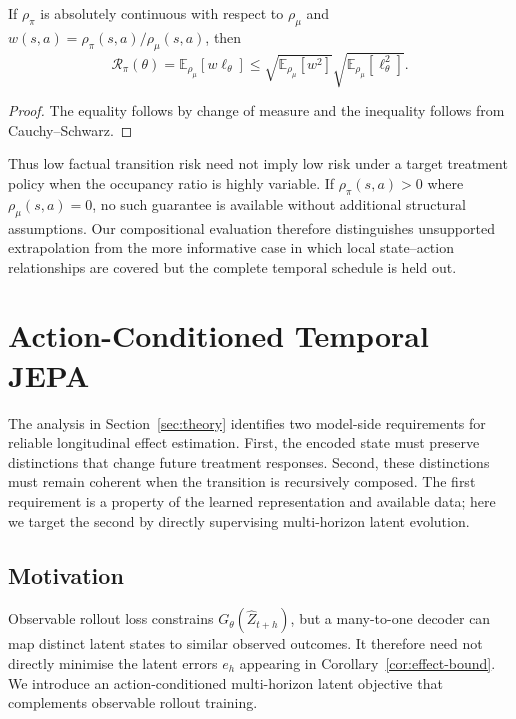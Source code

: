 \begin{proposition}
\label{prop:shift}
If $\rho_\pi$ is absolutely continuous with respect to $\rho_\mu$ and
$w(s,a)=\rho_\pi(s,a)/\rho_\mu(s,a)$, then
\begin{equation}
    \mathcal R_\pi(\theta)
    =\mathbb E_{\rho_\mu}[w\ell_\theta]
    \leq
    \sqrt{\mathbb E_{\rho_\mu}[w^2]}
    \sqrt{\mathbb E_{\rho_\mu}[\ell_\theta^2]}.
    \label{eq:shift-bound}
\end{equation}
\end{proposition}

\begin{proof}
The equality follows by change of measure and the inequality follows
from Cauchy--Schwarz.
\end{proof}

Thus low factual transition risk need not imply low risk under a target
treatment policy when the occupancy ratio is highly variable. If
$\rho_\pi(s,a)>0$ where $\rho_\mu(s,a)=0$, no such guarantee is
available without additional structural assumptions. Our compositional
evaluation therefore distinguishes unsupported extrapolation from the
more informative case in which local state--action relationships are
covered but the complete temporal schedule is held out.

\section{Action-Conditioned Temporal JEPA}
\label{sec:method}

The analysis in Section~\ref{sec:theory} identifies two model-side
requirements for reliable longitudinal effect estimation. First, the
encoded state must preserve distinctions that change future treatment
responses. Second, these distinctions must remain coherent when the
transition is recursively composed. The first requirement is a property
of the learned representation and available data; here we target the
second by directly supervising multi-horizon latent evolution.

\subsection{Motivation}

Observable rollout loss constrains $G_\theta(\widehat Z_{t+h})$, but a
many-to-one decoder can map distinct latent states to similar observed
outcomes. It therefore need not directly minimise the latent errors
$e_h$ appearing in Corollary~\ref{cor:effect-bound}. We introduce an
action-conditioned multi-horizon latent objective that complements
observable rollout training.

